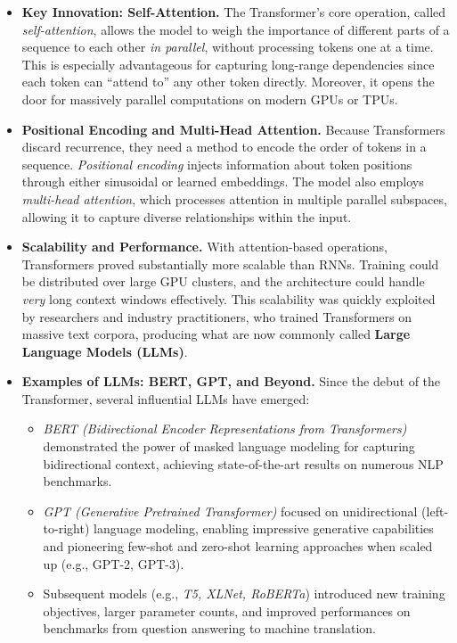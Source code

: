 \begin{itemize}
    \item \textbf{Key Innovation: Self-Attention.} 
    The Transformer’s core operation, called \textit{self-attention}, allows the model to weigh the importance of different parts of a sequence to each other \emph{in parallel}, without processing tokens one at a time. This is especially advantageous for capturing long-range dependencies since each token can “attend to” any other token directly. Moreover, it opens the door for massively parallel computations on modern GPUs or TPUs.

    \item \textbf{Positional Encoding and Multi-Head Attention.}
    Because Transformers discard recurrence, they need a method to encode the order of tokens in a sequence. \emph{Positional encoding} injects information about token positions through either sinusoidal or learned embeddings. The model also employs \textit{multi-head attention}, which processes attention in multiple parallel subspaces, allowing it to capture diverse relationships within the input.

    \item \textbf{Scalability and Performance.}
    With attention-based operations, Transformers proved substantially more scalable than RNNs. Training could be distributed over large GPU clusters, and the architecture could handle \emph{very} long context windows effectively. This scalability was quickly exploited by researchers and industry practitioners, who trained Transformers on massive text corpora, producing what are now commonly called \textbf{Large Language Models (LLMs)}.

    \item \textbf{Examples of LLMs: BERT, GPT, and Beyond.}
    Since the debut of the Transformer, several influential LLMs have emerged:
    \begin{itemize}
        \item \textit{BERT (Bidirectional Encoder Representations from Transformers)} demonstrated the power of masked language modeling for capturing bidirectional context, achieving state-of-the-art results on numerous NLP benchmarks.
        \item \textit{GPT (Generative Pretrained Transformer)} focused on unidirectional (left-to-right) language modeling, enabling impressive generative capabilities and pioneering few-shot and zero-shot learning approaches when scaled up (e.g., GPT-2, GPT-3).
        \item Subsequent models (e.g., \textit{T5, XLNet, RoBERTa}) introduced new training objectives, larger parameter counts, and improved performances on benchmarks from question answering to machine translation.
    \end{itemize}


\end{itemize}
